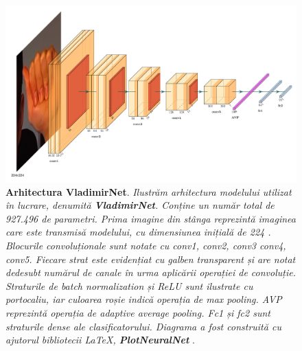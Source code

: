 \begin{figure}[H]
  \centering
  \includegraphics[width=\textwidth]{images/2-recunoasterea-asl/VladimirNetArchitecture.pdf}
  \caption[Arhitectura VladimirNet]{\textbf{Arhitectura VladimirNet}. \textit{Ilustrăm arhitectura modelului utilizat în lucrare, denumită \textbf{VladimirNet}. Conține un număr total de 927.496 de parametri. Prima imagine din stânga reprezintă imaginea care este transmisă modelului, cu dimensiunea inițială de 224 . Blocurile convoluționale sunt notate cu conv1, conv2, conv3 conv4, conv5. Fiecare strat este evidențiat cu galben transparent și are notat dedesubt numărul de canale în urma aplicării operației de convoluție. Straturile de batch normalization și ReLU sunt ilustrate cu portocaliu, iar culoarea roșie indică operația de max pooling. AVP reprezintă operația de adaptive average pooling. Fc1 și fc2 sunt straturile dense ale clasificatorului. Diagrama a fost construită cu ajutorul bibliotecii \LaTeX, \textbf{PlotNeuralNet}} \cite{haris_iqbal_2018_2526396}.}
  \label{fig:diagrama_vladimirnet}
\end{figure}

